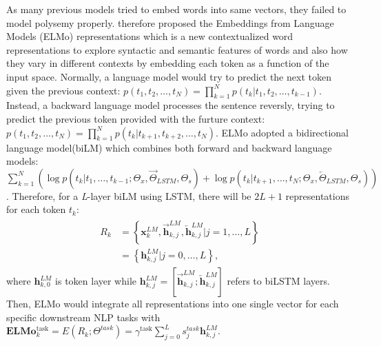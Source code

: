 \documentclass[12pt]{diazessay} %
\begin{document}
As many previous models tried to embed words into same vectors, they failed to model polysemy properly. \citet{peters2018deep} therefore proposed the Embeddings from Language Models (ELMo) representations which is a new contextualized word representations to explore syntactic and semantic features of words and also how they vary in different contexts by embedding each token as a function of the input space. Normally, a language model would try to predict the next token given the previous context: $p \left( t _ { 1 } , t _ { 2 } , \ldots , t _ { N } \right) = \prod _ { k = 1 } ^ { N } p \left( t _ { k } | t _ { 1 } , t _ { 2 } , \ldots , t _ { k - 1 } \right)$. Instead, a backward language model processes the sentence reversly, trying to predict the previous token provided with the furture context: $p \left( t _ { 1 } , t _ { 2 } , \ldots , t _ { N } \right) = \prod _ { k = 1 } ^ { N } p \left( t _ { k } | t _ { k + 1 } , t _ { k + 2 } , \ldots , t _ { N } \right)$. ELMo adopted a bidirectional language model(biLM) which combines both forward and backward language models: $\sum _ { k = 1 } ^ { N } ( \log p \left( t _ { k } | t _ { 1 } , \ldots , t _ { k - 1 } ; \Theta _ { x } , \overrightarrow { \Theta } _ { L S T M } , \Theta _ { s } \right) + \log p \left( t _ { k } | t _ { k + 1 } , \ldots , t _ { N } ; \Theta _ { x } , \overleftarrow{\Theta } _ { L S T M } , \Theta _ { s } \right) )$. Therefore, for a \textit{L}-layer biLM using LSTM, there will be $2L+1$ representations for each token $t_k$:
\begin{align} 
\begin{split}
  R _ { k } & = \left\{ \mathbf { x } _ { k } ^ { L M } , \overrightarrow { \mathbf { h } } _ { k , j } ^ { L M } , \overleftarrow { \mathbf { h } } _ { k , j } ^ { L M } | j = 1 , \ldots , L \right\} \\ & = \left\{ \mathbf { h } _ { k , j } ^ { L M } | j = 0 , \ldots , L \right\},
\end{split}         
\end{align}
where $\mathbf { h } _ { k , 0 } ^ { L M }$ is token layer while ${ \mathbf { h } } _ { k , j } ^ { L M } = [\overrightarrow { \mathbf { h } } _ { k , j } ^ { L M } ; \overleftarrow { \mathbf { h } } _ { k , j } ^ { L M }]$ refers to biLSTM layers. Then, ELMo would integrate all representations into one single vector for each specific downstream NLP tasks with $\mathbf { E } \mathbf { L } \mathbf { M } \mathbf { o } _ { k } ^ { \operatorname { task } } = E \left( R _ { k } ; \Theta ^ { t a s k } \right) = \gamma ^ { \operatorname { task } } \sum _ { j = 0 } ^ { L } s _ { j } ^ { t a s k } \mathbf { h } _ { k , j } ^ { L M }$.
\end{document}
